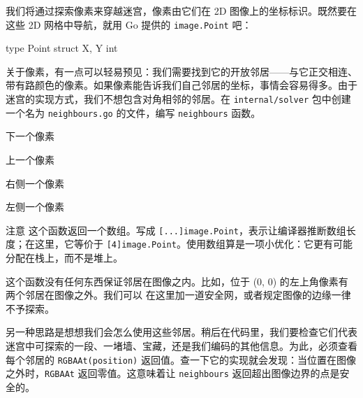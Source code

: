 我们将通过探索像素来穿越迷宫，像素由它们在 2D 图像上的坐标标识。既然要在这些 2D 网格中导航，就用 Go 提供的 \texttt{image.Point} 吧：

\begin{gocode}[]
type Point struct {
    X, Y int
}
\end{gocode}

关于像素，有一点可以轻易预见：我们需要找到它的开放邻居——与它正交相连、带有路颜色的像素。如果像素能告诉我们自己邻居的坐标，事情会容易得多。由于迷宫的实现方式，我们不想包含对角相邻的邻居。在 \texttt{internal/solver} 包中创建一个名为 \texttt{neighbours.go} 的文件，编写 \texttt{neighbours} 函数。


\begin{codeannotations}
\item 下一个像素
\item 上一个像素
\item 右侧一个像素
\item 左侧一个像素
\end{codeannotations}

\begin{infobox}{注意}
这个函数返回一个数组。写成 \texttt{[...]image.Point}，表示让编译器推断数组长度；在这里，它等价于 \texttt{[4]image.Point}。使用数组算是一项小优化：它更有可能分配在栈上，而不是堆上。
\end{infobox}

这个函数没有任何东西保证邻居在图像之内。比如，位于 (0, 0) 的左上角像素有两个邻居在图像之外。我们可以
在这里加一道安全网，或者规定图像的边缘一律不予探索。

另一种思路是想想我们会怎么使用这些邻居。稍后在代码里，我们要检查它们代表迷宫中可探索的一段、一堵墙、宝藏，还是我们编码的其他信息。为此，必须查看每个邻居的 \texttt{RGBAAt(position)} 返回值。查一下它的实现就会发现：当位置在图像之外时，\texttt{RGBAAt} 返回零值。这意味着让 \texttt{neighbours} 返回超出图像边界的点是安全的。

